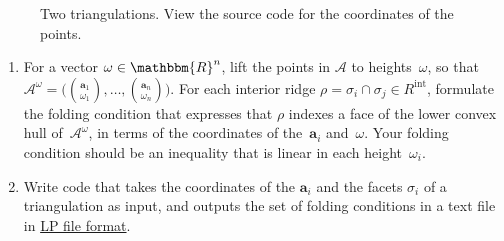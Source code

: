 \documentclass[11pt]{amsart}
\newcommand{\cA}{\mathcal{A}}
\newcommand{\RR}{\mathbbm{R}}
\newcommand{\aaa}{\mathbf{a}}
\newcommand{\defn}[1]{{\color{blue}#1}}
\begin{document}
\begin{enumerate}
  \begin{figure}[htbp]
    \centering
    \qquad
    \caption{Two triangulations.
    View the source code for the coordinates of the points.}
    \label{fig:triangs1}
  \end{figure}

  \begin{enumerate}
  \item
    For a vector $\omega\in\RR^n$, lift the points in $\cA$ to heights~$\omega$, so that
    $\cA^\omega=\big(\binom{\aaa_1}{\omega_1},\dots,\binom{\aaa_n}{\omega_n}\big)$.
    For each interior ridge $\rho=\sigma_i\cap\sigma_j\in R^{\text{int}}$,
    formulate the \defn{folding condition} that expresses that $\rho$ indexes a face of the lower convex hull of~$\cA^\omega$,
    in terms of the coordinates of the~$\aaa_i$ and~$\omega$.
    Your folding condition should be an inequality that is linear in each height~$\omega_i$.

  \item
    Write code that takes the coordinates of the $\aaa_i$ and the facets $\sigma_i$ of a triangulation as input,
    and outputs the set of folding conditions in a text file in
    \href{https://www.gurobi.com/documentation/8.1/refman/lp_format.html}{LP file format}.


\end{enumerate}
\end{enumerate}
\end{document}
